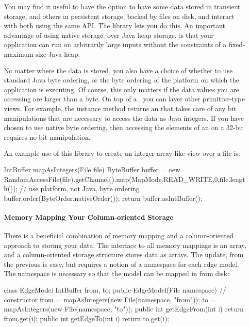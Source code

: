 You may find it useful to have the option to have some data stored in transient
storage, and others in persistent storage, backed by files on disk, and interact
with both using the same API. The  library lets you do this. An
important advantage of using native  storage, over Java heap
storage, is that your application can run on arbitrarily large inputs without the
constraints of a fixed-maximum size Java heap.

No matter where the data is stored, you also have a choice of whether to use
standard Java byte ordering, or the byte ordering of the platform on which the
application is executing. Of course, this only matters if the data values you are
accessing are larger than a byte. On top of a , you can layer
other primitive-type views. For example, the instance method
 returns an  that takes care of
any bit manipulations that are necessary to access the data as Java integers. If
you have chosen to use native byte ordering, then accessing the elements of an
 on a 32-bit \jre requires no bit manipulation.

An example use of this library to create an integer array-like view over a file
is:

\begin{shortlisting}
IntBuffer mapAsIntegers(File file) {
   ByteBuffer buffer = new RandomAccessFile(file).getChannel().map(MapMode.READ_WRITE,0,file.length());
   // use platform, not Java, byte ordering
   buffer.order(ByteOrder.nativeOrder());
   return buffer.asIntBuffer();
}
\end{shortlisting}

\paragraph{Memory Mapping Your Column-oriented Storage}

There is a beneficial combination of memory mapping and a column-oriented
approach to storing your data. The interface to all memory mappings is an
array, and a column-oriented storage structure stores data as arrays. The
update, from the previous  is easy, but requires a notion of a
namespace for each edge model. The namespace is necessary so that the model can
be mapped in from disk:

\begin{shortlisting}
class EdgeModel {
   IntBuffer from, to;
   public EdgeModel(File namespace) { // constructor
      from = mapAsIntegers(new File(namespace, "from"));
      to = mapAsIntegers(new File(namespace, "to"));
   }
   public int getEdgeFrom(int i) {
      return from.get(i);
   }
   public int getEdgeTo(int i) {
      return to.get(i);
   }
}
\end{shortlisting}

